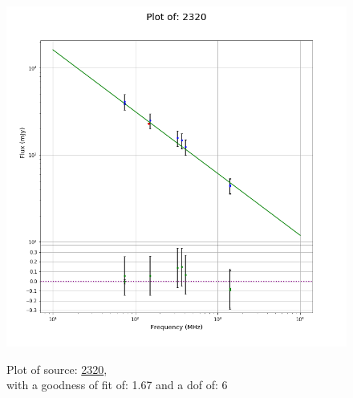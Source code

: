\documentclass{article}
\begin{document}
\begin{figure}[H]
\begin{minipage}{0.5\textwidth}
        \includegraphics[scale = 0.35]{KmeulenTrap4P23_1hr/1hr2320.png}
        \captionsetup{labelformat=empty}
        \caption{Plot of source: \href{http://banana.transientskp.org/r4/vlo_KmeulenTrap4P23/runningcatalog/2320}{2320},\\with a goodness of fit of: 1.67 and a dof of: 6}
    \addtocounter{figure}{-1}
    \label{KmeulenTrap4P23:1hr:2320:plot}
    \end{minipage}
\end{figure}
\newpage
\end{document}
